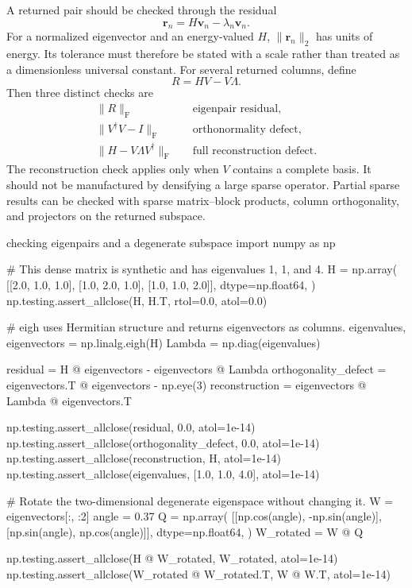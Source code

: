 A returned pair should be checked through the residual
\begin{equation}
  \mathbf r_n=H\mathbf v_n-\lambda_n\mathbf v_n.
  \label{eq:training-eigenpair-residual}
\end{equation}
For a normalized eigenvector and an energy-valued \(H\),
\(\|\mathbf r_n\|_2\) has units of energy. Its tolerance must therefore be
stated with a scale rather than treated as a dimensionless universal constant.
For several returned columns, define
\begin{equation}
  R=HV-V\Lambda.
\end{equation}
Then three distinct checks are
\begin{align}
  \|R\|_{\mathrm F}
  &\quad\text{eigenpair residual},\\
  \|V^{\dagger}V-I\|_{\mathrm F}
  &\quad\text{orthonormality defect},\\
  \|H-V\Lambda V^{\dagger}\|_{\mathrm F}
  &\quad\text{full reconstruction defect}.
\end{align}
The reconstruction check applies only when \(V\) contains a complete basis.
It should not be manufactured by densifying a large sparse operator. Partial
sparse results can be checked with sparse matrix--block products, column
orthogonality, and projectors on the returned subspace.

\begin{pythonexample}{checking eigenpairs and a degenerate subspace}
import numpy as np

# This dense matrix is synthetic and has eigenvalues 1, 1, and 4.
H = np.array(
    [[2.0, 1.0, 1.0], [1.0, 2.0, 1.0], [1.0, 1.0, 2.0]],
    dtype=np.float64,
)
np.testing.assert_allclose(H, H.T, rtol=0.0, atol=0.0)

# eigh uses Hermitian structure and returns eigenvectors as columns.
eigenvalues, eigenvectors = np.linalg.eigh(H)
Lambda = np.diag(eigenvalues)

residual = H @ eigenvectors - eigenvectors @ Lambda
orthogonality_defect = eigenvectors.T @ eigenvectors - np.eye(3)
reconstruction = eigenvectors @ Lambda @ eigenvectors.T

np.testing.assert_allclose(residual, 0.0, atol=1e-14)
np.testing.assert_allclose(orthogonality_defect, 0.0, atol=1e-14)
np.testing.assert_allclose(reconstruction, H, atol=1e-14)
np.testing.assert_allclose(eigenvalues, [1.0, 1.0, 4.0], atol=1e-14)

# Rotate the two-dimensional degenerate eigenspace without changing it.
W = eigenvectors[:, :2]
angle = 0.37
Q = np.array(
    [[np.cos(angle), -np.sin(angle)], [np.sin(angle), np.cos(angle)]],
    dtype=np.float64,
)
W_rotated = W @ Q

np.testing.assert_allclose(H @ W_rotated, W_rotated, atol=1e-14)
np.testing.assert_allclose(W_rotated @ W_rotated.T, W @ W.T, atol=1e-14)
\end{pythonexample}

